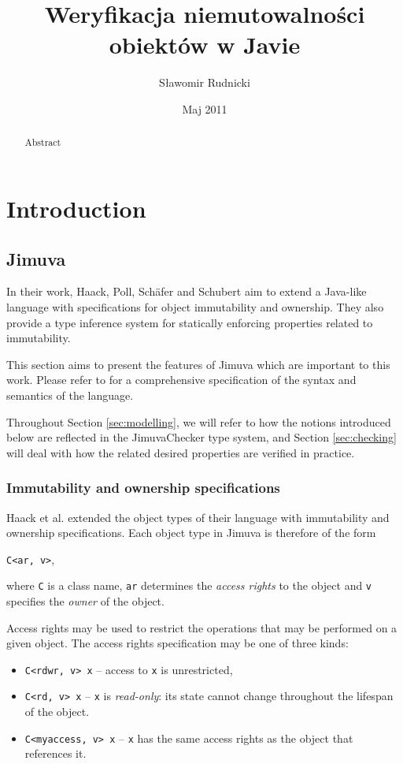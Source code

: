 \documentclass{pracamgr}
\author{Sławomir Rudnicki}
\title{Weryfikacja niemutowalności obiektów w Javie}
\date{Maj 2011}
\begin{document}
\maketitle

\begin{abstract}
  Abstract %
\end{abstract}

\tableofcontents

\chapter{Introduction}
\label{chap:intro}

\section{Jimuva}
\label{sec:jimuva}

In their work, Haack, Poll, Schäfer and Schubert \cite{haack} aim to
extend a Java-like language with specifications for object
immutability and ownership. They also provide a type inference system
for statically enforcing properties related to immutability.

This section aims to present the features of Jimuva which are
important to this work. Please refer to \cite{haack} for a
comprehensive specification of the syntax and semantics of the
language. 

Throughout Section \ref{sec:modelling}, we will refer to how the
notions introduced below are reflected in the JimuvaChecker type
system, and Section \ref{sec:checking} will deal with how the related
desired properties are verified in practice.

\subsection{Immutability and ownership specifications}
\label{subsec:imm-spec}

Haack et al. extended the object types of their language with
immutability and ownership specifications. Each object type in Jimuva
is therefore of the form
\begin{center}
  \texttt{C<ar, v>},
\end{center}
where \texttt{C} is a class name, \texttt{ar} determines the
\emph{access rights} to the object and \texttt{v} specifies the
\emph{owner} of the object.

Access rights may be used to restrict the operations that may be
performed on a given object. The access rights specification may be
one of three kinds:
\begin{itemize}
\item \texttt{C<rdwr, v> x} -- access to \texttt{x} is unrestricted, 
\item \texttt{C<rd, v> x} -- \texttt{x} is \emph{read-only}: its state
  cannot change throughout the lifespan of the object.
\item \texttt{C<myaccess, v> x} -- \texttt{x} has the same access
  rights as the object that references it.
\end{itemize}
\end{document}
